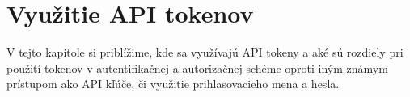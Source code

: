 \chapter{Využitie API tokenov}

\label{kap:vyuzitie} %

V tejto kapitole si priblížime, kde sa využívajú API tokeny a aké sú rozdiely pri použití tokenov v autentifikačnej a autorizačnej schéme oproti iným známym prístupom ako API kľúče, či využitie prihlasovacieho mena a hesla.
